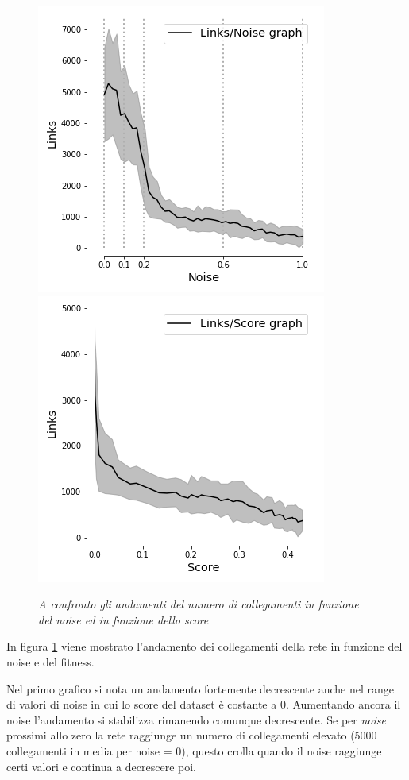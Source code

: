 \documentclass[12pt,a4paper]{report}
\begin{document}
\begin{figure}[H]
 \centering
 \includegraphics[scale = 0.6]{images/links_noise_moons}
 \includegraphics[scale = 0.6]{images/Links_Score_moons}
 \caption{\textit{A confronto gli andamenti del numero di collegamenti in funzione del noise ed in funzione dello score}}
 \label{linksmoons}
\end{figure}

In figura \ref{linksmoons} viene mostrato l'andamento dei collegamenti della rete in funzione del noise e del fitness.

Nel primo grafico si nota un andamento fortemente decrescente anche nel range di valori di noise in cui lo score del dataset è costante a 0. Aumentando ancora il noise l'andamento si stabilizza rimanendo comunque decrescente. Se per \textit{noise} prossimi allo zero la rete raggiunge un numero di collegamenti elevato (5000 collegamenti in media per noise = 0), questo crolla quando il noise raggiunge certi valori e continua a decrescere poi.
\end{document}
